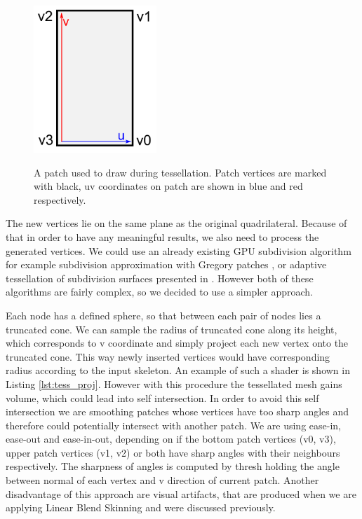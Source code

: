 \begin{figure}[h]
    \centering
    \includegraphics[height=15em]{images/tess_patch}
    \label{fig:tess_patch}
    \caption[Tessellation patch]{A patch used to draw during tessellation. Patch vertices are marked with black, uv coordinates on patch are shown in blue and red respectively.}
\end{figure}

The new vertices lie on the same plane as the original quadrilateral.
Because of that in order to have any meaningful results, we also need to process the generated vertices.
We could use an already existing GPU subdivision algorithm for example subdivision approximation with Gregory patches \cite{gregory_patch}, or adaptive tessellation of subdivision surfaces presented in \cite{gpu_gems_2}.
However both of these algorithms are fairly complex, so we decided to use a simpler approach.

Each node has a defined sphere, so that between each pair of nodes lies a truncated cone.
We can sample the radius of truncated cone along its height, which corresponds to v coordinate and simply project each new vertex onto the truncated cone.
This way newly inserted vertices would have corresponding radius according to the input skeleton.
An example of such a shader is shown in Listing \ref{lst:tess_proj}.
However with this procedure the tessellated mesh gains volume, which could lead into self intersection.
In order to avoid this self intersection we are smoothing patches whose vertices have too sharp angles and therefore could potentially intersect with another patch.
We are using ease-in, ease-out and ease-in-out, depending on if the bottom patch vertices (v0, v3), upper patch vertices (v1, v2) or both have sharp angles with their neighbours respectively.
The sharpness of angles is computed by thresh holding the angle between normal of each vertex and v direction of current patch.
Another disadvantage of this approach are visual artifacts, that are produced when we are applying Linear Blend Skinning and were discussed previously.

